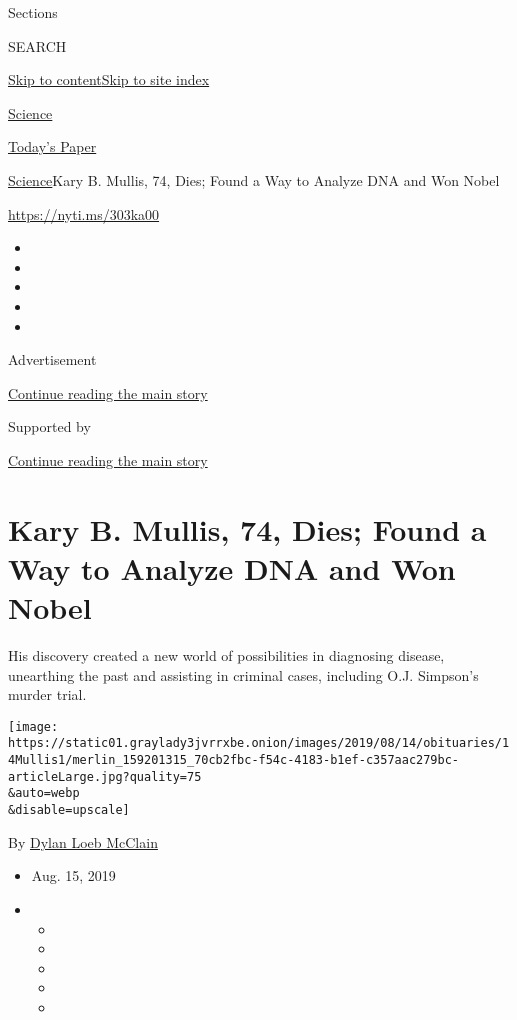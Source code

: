 Sections

SEARCH

\protect\hyperlink{site-content}{Skip to
content}\protect\hyperlink{site-index}{Skip to site index}

\href{https://www.nytimes3xbfgragh.onion/section/science}{Science}

\href{https://myaccount.nytimes3xbfgragh.onion/auth/login?response_type=cookie\&client_id=vi}{}

\href{https://www.nytimes3xbfgragh.onion/section/todayspaper}{Today's
Paper}

\href{/section/science}{Science}\textbar{}Kary B. Mullis, 74, Dies;
Found a Way to Analyze DNA and Won Nobel

\url{https://nyti.ms/303ka00}

\begin{itemize}
\item
\item
\item
\item
\item
\end{itemize}

Advertisement

\protect\hyperlink{after-top}{Continue reading the main story}

Supported by

\protect\hyperlink{after-sponsor}{Continue reading the main story}

\hypertarget{kary-b-mullis-74-dies-found-a-way-to-analyze-dna-and-won-nobel}{%
\section{Kary B. Mullis, 74, Dies; Found a Way to Analyze DNA and Won
Nobel}\label{kary-b-mullis-74-dies-found-a-way-to-analyze-dna-and-won-nobel}}

His discovery created a new world of possibilities in diagnosing
disease, unearthing the past and assisting in criminal cases, including
O.J. Simpson's murder trial.

\texttt{[image: https://static01.graylady3jvrrxbe.onion/images/2019/08/14/obituaries/14Mullis1/merlin\_159201315\_70cb2fbc-f54c-4183-b1ef-c357aac279bc-articleLarge.jpg?quality=75\\\&auto=webp\\\&disable=upscale]}

By \href{https://www.nytimes3xbfgragh.onion/by/dylan-loeb-mcclain}{Dylan
Loeb McClain}

\begin{itemize}
\item
  Aug. 15, 2019
\item
  \begin{itemize}
  \item
  \item
  \item
  \item
  \item
  \end{itemize}
\end{itemize}

